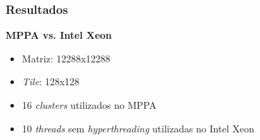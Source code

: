 \documentclass[xcolor={table}]{beamer}
\begin{document}
\begin{frame}
\begin{figure}
    \end{figure}
\end{frame}

\begin{frame}\frametitle{Resultados}
    \textbf{MPPA vs. Intel Xeon}
	\begin{itemize}
	\item Matriz: 12288x12288
    \item \textit{Tile}: 128x128
    \item 16 \textit{clusters} utilizados no MPPA
    \item 10 \textit{threads} sem \textit{hyperthreading} utilizadas no Intel Xeon
	\end{itemize}
\end{frame}
\end{document}
